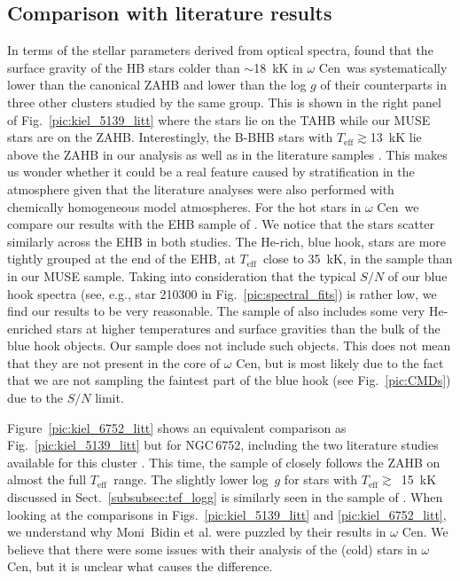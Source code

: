 \documentclass{aa}
\newcommand{\teff}{$T_{\text{eff}}$}
\newcommand{\Cen}{$\omega$ Cen}
\newcommand{\ngc}{NGC\,6752}
\begin{document}
\subsection{Comparison with literature results} 
\label{sec:comp_litt}
In terms of the stellar parameters derived from optical spectra, \citet{monibidin2012} found that the surface gravity of the HB stars colder than $\sim$18~kK in \Cen\ was systematically lower than the canonical ZAHB and lower than the log $g$ of their counterparts in three other clusters studied by the same group. This is shown in the right panel of Fig.~\ref{pic:kiel_5139_litt} where the \citet{monibidin2012} stars lie on the TAHB while our MUSE stars are on the ZAHB. 
Interestingly, the B-BHB stars with \teff$\gtrsim$13~kK lie above the ZAHB in our analysis as well as in the literature samples \citep{monibidin2012,moehler2011}. This makes us wonder whether it could be a real feature caused by stratification in the atmosphere \citep{leblanc2010} given that the literature analyses were also performed with chemically homogeneous model atmospheres. 
For the hot stars in \Cen\ we compare our results with the EHB sample of \citet{latour2018}. We notice that the stars scatter similarly across the EHB in both studies. The He-rich, blue hook, stars are more tightly grouped at the end of the EHB, at \teff\ close to 35~kK, in the \citet{latour2018} sample than in our MUSE sample. Taking into consideration that the typical $S/N$ of our blue hook spectra (see, e.g., star 210300 in Fig.~\ref{pic:spectral_fits}) is rather low, we find our results to be very reasonable. The sample of \citet{latour2018} also includes some very He-enriched stars at higher temperatures and surface gravities than the bulk of the blue hook objects. Our sample does not include such objects. This does not mean that they are not present in the core of \Cen, but is most likely due to the fact that we are not sampling the faintest part of the blue hook (see Fig.~\ref{pic:CMDs}) due to the $S/N$ limit. 

Figure~\ref{pic:kiel_6752_litt} shows an equivalent comparison as Fig.~\ref{pic:kiel_5139_litt} but for \ngc, including the two literature studies available for this cluster \citep{1999A&A...346L...1M,monibidin2007}. This time, the sample of \citet{monibidin2007} closely follows the ZAHB on almost the full \teff\ range. The slightly lower log~$g$ for stars with \teff $\gtrsim$~15~kK discussed in Sect.~\ref{subsubsec:tef_logg} is similarly seen in the sample of \citet{1999A&A...346L...1M}. 
When looking at the comparisons in Figs.~\ref{pic:kiel_5139_litt} and \ref{pic:kiel_6752_litt}, we understand why Moni~Bidin et al. were puzzled by their results in \Cen. 
We believe that there were some issues with their analysis of the (cold) stars in \Cen, but it is unclear what causes the difference.
\end{document}
